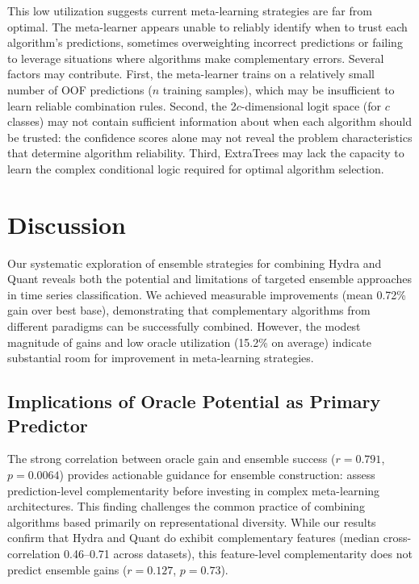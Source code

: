 \documentclass[pdflatex,sn-basic]{sn-jnl}           %
\theoremstyle{thmstyleone}%
\theoremstyle{thmstyletwo}%
\theoremstyle{thmstylethree}%
\begin{document}
This low utilization suggests current meta-learning strategies are far from optimal. The meta-learner appears unable to reliably identify when to trust each algorithm's predictions, sometimes overweighting incorrect predictions or failing to leverage situations where algorithms make complementary errors. Several factors may contribute. First, the meta-learner trains on a relatively small number of OOF predictions ($n$ training samples), which may be insufficient to learn reliable combination rules. Second, the 2$c$-dimensional logit space (for $c$ classes) may not contain sufficient information about when each algorithm should be trusted: the confidence scores alone may not reveal the problem characteristics that determine algorithm reliability. Third, ExtraTrees may lack the capacity to learn the complex conditional logic required for optimal algorithm selection.

\clearpage

\section{Discussion}\label{sec6}

Our systematic exploration of ensemble strategies for combining Hydra and Quant reveals both the potential and limitations of targeted ensemble approaches in time series classification. We achieved measurable improvements (mean 0.72\% gain over best base), demonstrating that complementary algorithms from different paradigms can be successfully combined. However, the modest magnitude of gains and low oracle utilization (15.2\% on average) indicate substantial room for improvement in meta-learning strategies.

\subsection{Implications of Oracle Potential as Primary Predictor}

The strong correlation between oracle gain and ensemble success ($r=0.791$, $p=0.0064$) provides actionable guidance for ensemble construction: assess prediction-level complementarity before investing in complex meta-learning architectures. This finding challenges the common practice of combining algorithms based primarily on representational diversity. While our results confirm that Hydra and Quant do exhibit complementary features (median cross-correlation 0.46--0.71 across datasets), this feature-level complementarity does not predict ensemble gains ($r=0.127$, $p=0.73$).
\end{document}
